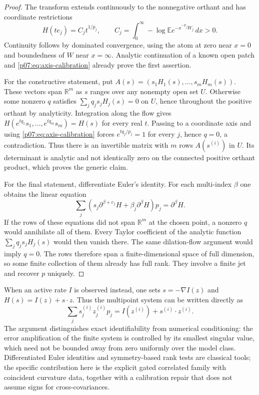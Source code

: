 \documentclass[11pt,letterpaper]{article}
\theoremstyle{definition}
\theoremstyle{remark}
\newcommand{\1}{\mathbf 1}
\begin{document}
\begin{proof}
The transform extends continuously to the nonnegative orthant and
has coordinate restrictions
\begin{equation}\label{p07:eq:axis-calibration}
 H(te_j)=C_jt^{1/p_j},\qquad
 C_j=\int_0^\infty-\log\mathbb E e^{-x^{-p_j}W_j}\,dx>0.
\end{equation}
Continuity follows by dominated convergence, using the atom at zero
near $x=0$ and boundedness of $W$ near $x=\infty$.
Analytic continuation of a known open patch and
\eqref{p07:eq:axis-calibration} already prove the first assertion.

For the constructive statement, put
$A(s)=(s_1H_1(s),\ldots,s_mH_m(s))$.
These vectors span $\mathbb R^m$ as $s$ ranges over any nonempty open
set $U$.  Otherwise some nonzero $q$ satisfies
$\sum_jq_js_jH_j(s)=0$ on $U$, hence throughout the positive orthant
by analyticity.  Integration along the flow gives
$H(e^{tq_1}s_1,\ldots,e^{tq_m}s_m)=H(s)$ for every real $t$.
Passing to a coordinate axis and using \eqref{p07:eq:axis-calibration}
forces $e^{tq_j/p_j}=1$ for every $j$, hence $q=0$, a contradiction.
Thus there is an invertible matrix with $m$ rows $A(s^{(i)})$ in
$U$.  Its determinant is analytic and not identically zero on the
connected positive orthant product, which proves the generic claim.

For the final statement, differentiate Euler's identity.  For each
multi-index $\beta$ one obtains the linear equation
\begin{equation}\label{p07:eq:all-jet-euler}
 \sum_j\left(s_j\partial^{\beta+e_j}H
          +\beta_j\partial^\beta H\right)p_j
       =\partial^\beta H.
\end{equation}
If the rows of these equations did not span $\mathbb R^m$ at the
chosen point, a nonzero $q$ would annihilate all of them.  Every
Taylor coefficient of the analytic function
$\sum_jq_js_jH_j(s)$ would then vanish there.  The same dilation-flow
argument would imply $q=0$.  The rows therefore span a finite-dimensional
space of full dimension, so some finite collection of them already
has full rank.  They involve a finite jet and recover $p$ uniquely.
\end{proof}

When an active rate $I$ is observed instead, one sets
$s=-\nabla I(z)$ and $H(s)=I(z)+s\cdot z$.  Thus the multipoint
system can be written directly as
\[
 \sum_j s_j^{(i)}z_j^{(i)}p_j
       =I(z^{(i)})+s^{(i)}\cdot z^{(i)}.
\]
The argument distinguishes exact identifiability from numerical
conditioning: the error amplification of the finite system is
controlled by its smallest singular value, which need not be bounded
away from zero uniformly over the model class.  Differentiated Euler
identities and symmetry-based rank tests are classical tools; the
specific contribution here is the explicit gated correlated family
with coincident curvature data, together with a calibration repair
that does not assume signs for cross-covariances.
\end{document}
